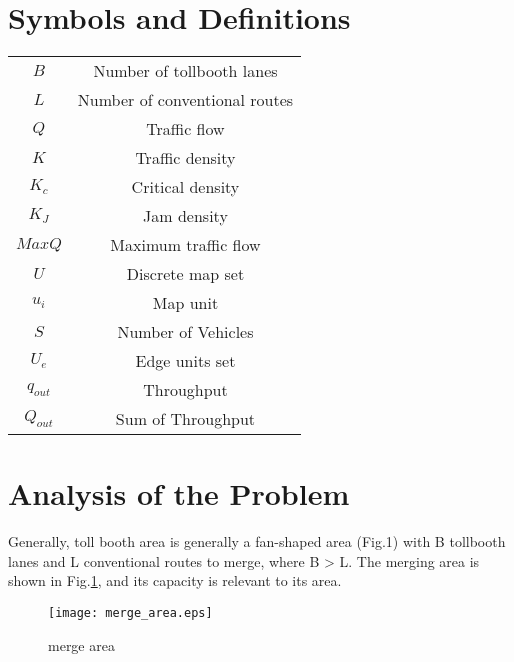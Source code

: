 \documentclass{mcmthesis}
\begin{document}
\section{Symbols and Definitions}
	\begin{tabular}{c|c}
		\toprule
		\makebox[0.4\textwidth][c]{Symbols}	&  \makebox[0.5\textwidth][c]{Meaning} \\ \hline
		$B$	&	Number of tollbooth lanes\\
		$L$	&	Number of conventional routes\\
		$Q$	&	Traffic flow\\
		$K$	&	Traffic density\\
		$K_c$	&	Critical density\\
		$K_J$	&	Jam density \\
		$MaxQ$	&	Maximum traffic flow \\
		$U$			&	Discrete map set \\
		$u_i$		&	Map unit \\
		$S$			&	Number of Vehicles \\
		$U_e$	&	Edge units set \\
		$q_{out}$	&	Throughput \\
		$Q_{out}$	& 	Sum of Throughput\\
		\bottomrule
	\end{tabular} 

\section{Analysis of the Problem}
Generally, toll booth area is generally a fan-shaped area (Fig.1) with B tollbooth lanes and L conventional routes to merge, where B > L.
The merging area is shown in Fig.\ref{fig:merge_area}, and its capacity is relevant to its area\cite{woo1991toll}.
\begin{figure}[!h]
	\centering
	\texttt{[image: merge\_area.eps]}
	\caption{\label{fig:merge_area}merge area}
\end{figure}
\end{document}
